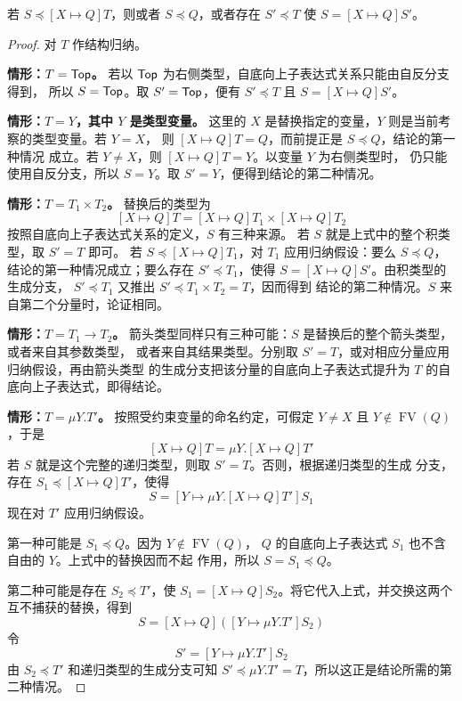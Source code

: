 \begin{lemma}
\label{lem:21.9.9}
若 \(S\preccurlyeq[X\mapsto Q]T\)，则或者 \(S\preccurlyeq Q\)，或者存在
\(S'\preccurlyeq T\) 使 \(S=[X\mapsto Q]S'\)。
\end{lemma}


\begin{proof}
对 \(T\) 作结构归纳。

\textbf{情形：\(T=\mathsf{Top}\)。}
若以 \(\mathsf{Top}\) 为右侧类型，自底向上子表达式关系只能由自反分支得到，
所以 \(S=\mathsf{Top}\)。取 \(S'=\mathsf{Top}\)，便有
\(S'\preccurlyeq T\) 且 \(S=[X\mapsto Q]S'\)。

\textbf{情形：\(T=Y\)，其中 \(Y\) 是类型变量。}
这里的 \(X\) 是替换指定的变量，\(Y\) 则是当前考察的类型变量。若 \(Y=X\)，
则 \([X\mapsto Q]T=Q\)，而前提正是 \(S\preccurlyeq Q\)，结论的第一种情况
成立。若 \(Y\ne X\)，则 \([X\mapsto Q]T=Y\)。以变量 \(Y\) 为右侧类型时，
仍只能使用自反分支，所以 \(S=Y\)。取 \(S'=Y\)，便得到结论的第二种情况。

\textbf{情形：\(T=T_1\times T_2\)。}
替换后的类型为
\[
[X\mapsto Q]T=[X\mapsto Q]T_1\times[X\mapsto Q]T_2
\]
按照自底向上子表达式关系的定义，\(S\) 有三种来源。
若 \(S\) 就是上式中的整个积类型，取 \(S'=T\) 即可。
若 \(S\preccurlyeq[X\mapsto Q]T_1\)，对 \(T_1\) 应用归纳假设：要么
\(S\preccurlyeq Q\)，结论的第一种情况成立；要么存在
\(S'\preccurlyeq T_1\)，使得 \(S=[X\mapsto Q]S'\)。由积类型的生成分支，
\(S'\preccurlyeq T_1\) 又推出 \(S'\preccurlyeq T_1\times T_2=T\)，因而得到
结论的第二种情况。\(S\) 来自第二个分量时，论证相同。

\textbf{情形：\(T=T_1\to T_2\)。}
箭头类型同样只有三种可能：\(S\) 是替换后的整个箭头类型，或者来自其参数类型，
或者来自其结果类型。分别取 \(S'=T\)，或对相应分量应用归纳假设，再由箭头类型
的生成分支把该分量的自底向上子表达式提升为 \(T\) 的自底向上子表达式，即得结论。

\textbf{情形：\(T=\mu Y.T'\)。}
按照受约束变量的命名约定，可假定 \(Y\ne X\) 且
\(Y\notin\operatorname{FV}(Q)\)，于是
\[
[X\mapsto Q]T=\mu Y.[X\mapsto Q]T'
\]
若 \(S\) 就是这个完整的递归类型，则取 \(S'=T\)。否则，根据递归类型的生成
分支，存在 \(S_1\preccurlyeq[X\mapsto Q]T'\)，使得
\[
S=[Y\mapsto\mu Y.[X\mapsto Q]T']S_1
\]
现在对 \(T'\) 应用归纳假设。

第一种可能是 \(S_1\preccurlyeq Q\)。因为 \(Y\notin\operatorname{FV}(Q)\)，
\(Q\) 的自底向上子表达式 \(S_1\) 也不含自由的 \(Y\)。上式中的替换因而不起
作用，所以 \(S=S_1\preccurlyeq Q\)。

第二种可能是存在 \(S_2\preccurlyeq T'\)，使
\(S_1=[X\mapsto Q]S_2\)。将它代入上式，并交换这两个互不捕获的替换，得到
\[
S=[X\mapsto Q]([Y\mapsto\mu Y.T']S_2)
\]
令
\[
S'=[Y\mapsto\mu Y.T']S_2
\]
由 \(S_2\preccurlyeq T'\) 和递归类型的生成分支可知
\(S'\preccurlyeq\mu Y.T'=T\)，所以这正是结论所需的第二种情况。
\end{proof}

